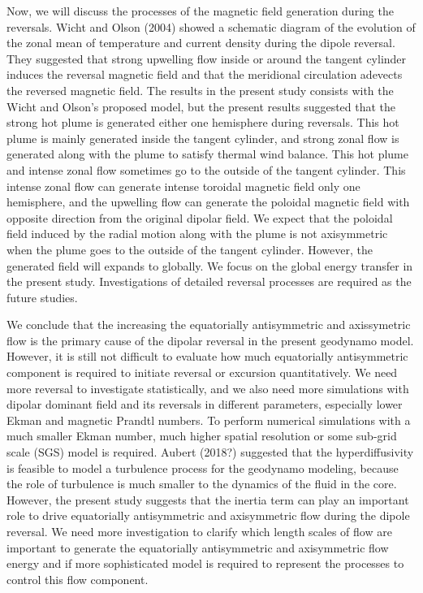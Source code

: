Now, we will discuss the processes of the magnetic field generation during the reversals. 
Wicht and Olson (2004) \cite{WIcht:2004} showed a schematic diagram of the evolution of the zonal mean of temperature and current density during the dipole reversal. 
They suggested that strong upwelling flow inside or around the tangent cylinder induces the reversal magnetic field and that the meridional circulation adevects the reversed magnetic field. 
The results in the present study consists with the Wicht and Olson's proposed model, but the present results suggested that the strong hot plume is generated either one hemisphere during reversals. 
This hot plume is mainly generated inside the tangent cylinder, and strong zonal flow is generated along with the plume to satisfy thermal wind balance. 
This hot plume and intense zonal flow sometimes go to the outside of the tangent cylinder. 
This intense zonal flow can generate intense toroidal magnetic field only one hemisphere, and the upwelling flow can generate the poloidal magnetic field with opposite direction from the original dipolar field. 
We expect that the poloidal field induced by the radial motion along with the plume is not axisymmetric when the plume goes to the outside of the tangent cylinder. 
However, the generated field will expands to globally. 
We focus on the global energy transfer in the present study. 
Investigations of detailed reversal processes are required as the future studies.

We conclude that the increasing the equatorially antisymmetric and axissymetric flow is the primary cause of the dipolar reversal in the present geodynamo model. 
However, it is still not difficult to evaluate how much equatorially antisymmetric component is required to initiate reversal or excursion quantitatively. 
We need more reversal to investigate statistically, and we also need more simulations with dipolar dominant field and its reversals in different parameters, especially lower Ekman and magnetic Prandtl numbers. 
To perform numerical simulations with a much smaller Ekman number, much higher spatial resolution or some sub-grid scale (SGS) model is required. 
Aubert (2018?) suggested that the hyperdiffusivity is feasible to model a turbulence process for the geodynamo modeling, because the role of turbulence is much smaller to the dynamics of the fluid in the core. 
However, the present study suggests that the inertia term can play an important role to drive equatorially antisymmetric and axisymmetric flow during the dipole reversal. 
We need more investigation to clarify which length scales of flow are important to generate the equatorially antisymmetric and axisymmetric flow energy and if more sophisticated model is required to represent the processes to control this flow component.

